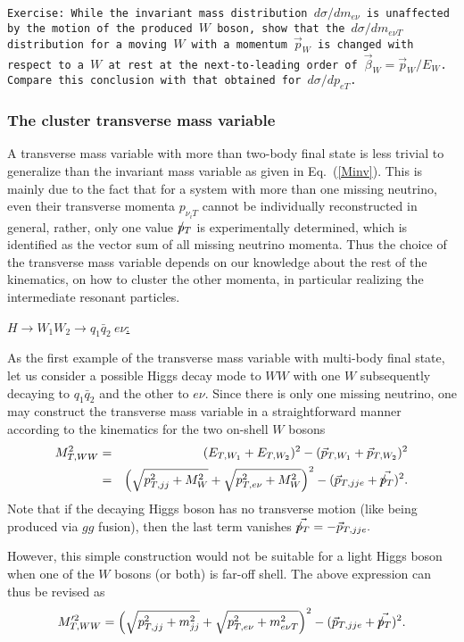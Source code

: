 \documentclass[prd,aps,floats,preprintnumbers,preprint,superscriptaddress,floatfix,nofootinbib]{revtex4}
\newcommand{ \slashchar }[1]{\setbox0=\hbox{$#1$}   %
   \dimen0=\wd0                                     %
   \setbox1=\hbox{/} \dimen1=\wd1                   %
   \ifdim\dimen0>\dimen1                            %
      \rlap{\hbox to \dimen0{\hfil/\hfil}}          %
      #1                                            %
   \else                                            %
      \rlap{\hbox to \dimen1{\hfil$#1$\hfil}}       %
      /                                             %
   \fi}                                             %
\def\ptmiss{\slashchar{p}_{T}}
\def\bea{\begin{eqnarray}}
\def\eea{\end{eqnarray}}
\begin{document}
{
\vskip 0.2cm
\noindent
\tt Exercise: While the invariant mass distribution $d\sigma/dm_{e\nu}$ is unaffected 
 by the motion of the produced $W$ boson, show that the $d\sigma/ dm_{e\nu T}^{}$ 
 distribution for a moving $W$ with a momentum $\vec p_W^{}$ is changed with 
 respect to a $W$ at rest  at the next-to-leading order of $\vec \beta_W^{} = \vec p_W^{}/E_W$.
Compare this conclusion with that obtained for  $d\sigma/ dp_{eT}^{}$.
\vskip 0.2cm
}

\subsubsection{The cluster transverse mass variable}

A  transverse mass variable with more than two-body final state is
less trivial to generalize than the invariant mass variable 
as given in Eq.~(\ref{Minv}).  This is mainly due to the fact that for a system
with more than one missing neutrino, even their transverse 
momenta $p_{\nu_i T}$
cannot be  individually reconstructed in general,  rather,  only one value
$\ptmiss$ is experimentally determined, which is identified as the vector
sum of all missing neutrino momenta.  Thus the choice of the
transverse mass variable depends on our knowledge about
the rest of the kinematics, on how to cluster the other momenta, 
in particular realizing the intermediate resonant particles. 

\vskip 0.2cm
\noindent
\underline{$H\to W_1 W_2 \to q_1 \bar q_2\ e \nu$:}

As the first example of the transverse mass variable with multi-body
final state, let us consider a possible Higgs decay mode
to $WW$ with one $W$ subsequently decaying to $q_1 \bar q_2$ 
and the other to $e\nu$. Since there is only one missing neutrino,
one may construct the transverse mass variable in a straightforward 
manner according to the kinematics for the two on-shell $W$ bosons
%
\bea
\nonumber
 M_{T,WW}^2 &=&  (E_{T,W_1} + E_{T,W_2} )^2 - (\vec p_{T,W_1} + \vec p_{T,W_2} )^2 \\
&=& \left( \sqrt{p_{T,jj}^2 + M_W^2} + \sqrt{p_{T,e\nu}^2 + M_W^2}  \right)^2 
- (\vec p_{T,jje} + \vec{\ptmiss } )^2.
\nonumber
\eea
Note that if the decaying Higgs boson has no transverse motion (like being
produced via $gg$ fusion), then the last term vanishes $\vec{\ptmiss }=-\vec p_{T,jje}.$

However, this simple construction would not be suitable for a light Higgs boson
when one of the $W$ bosons (or both) is far-off shell. 
The above expression can thus be revised as 
\bea
 M_{T,WW}^{\prime 2} 
 = \left( \sqrt{p_{T,jj}^2 + m_{jj}^2} + \sqrt{p_{T,e\nu}^2 + m_{e\nu T}^2}  \right)^2 
- (\vec p_{T,jje} + \vec{\ptmiss } )^2.
\nonumber
\eea
\end{document}

